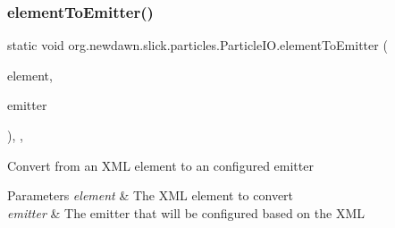 \subsubsection{\texorpdfstring{element\+To\+Emitter()}{elementToEmitter()}}
{\footnotesize\ttfamily static void org.\+newdawn.\+slick.\+particles.\+Particle\+I\+O.\+element\+To\+Emitter (\begin{DoxyParamCaption}\item[{Element}]{element,  }\item[{\mbox{\hyperlink{classorg_1_1newdawn_1_1slick_1_1particles_1_1_configurable_emitter}{Configurable\+Emitter}}}]{emitter }\end{DoxyParamCaption})\hspace{0.3cm}{\ttfamily [inline]}, {\ttfamily [static]}, {\ttfamily [private]}}

Convert from an X\+ML element to an configured emitter


\begin{DoxyParams}{Parameters}
{\em element} & The X\+ML element to convert \\
\hline
{\em emitter} & The emitter that will be configured based on the X\+ML \\
\hline
\end{DoxyParams}

